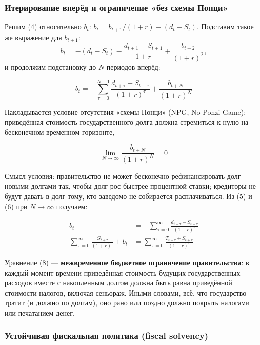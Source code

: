 \documentclass[11pt,a4paper]{article}
\begin{document}
\subsubsection{Итерирование вперёд и ограничение «без схемы Понци»}

Решим (4) относительно $b_t$: $b_t=b_{t+1}/(1+r)-(d_t-S_t)$. Подставим такое же выражение для $b_{t+1}$:
$$b_t=-(d_t-S_t)-\frac{d_{t+1}-S_{t+1}}{1+r}+\frac{b_{t+2}}{(1+r)^2},$$
и продолжим подстановку до $N$ периодов вперёд:
\begin{formulabox}
\begin{equation}
b_t=-\sum_{\tau=0}^{N-1}\frac{d_{t+\tau}-S_{t+\tau}}{(1+r)^{\tau}}+\frac{b_{t+N}}{(1+r)^{N}} \tag{5}
\end{equation}
\end{formulabox}
Накладывается условие отсутствия «схемы Понци» (NPG, No-Ponzi-Game): приведённая стоимость государственного долга должна стремиться к нулю на бесконечном временном горизонте,
\begin{formulabox}
\begin{equation}
\lim_{N\to\infty}\frac{b_{t+N}}{(1+r)^{N}}=0 \tag{6}
\end{equation}
\end{formulabox}
Смысл условия: правительство не может бесконечно рефинансировать долг новыми долгами так, чтобы долг рос быстрее процентной ставки; кредиторы не будут давать в долг тому, кто заведомо не собирается расплачиваться. Из (5) и (6) при $N\to\infty$ получаем:
\begin{formulabox}
\begin{align}
b_t&=-\sum_{\tau=0}^{\infty}\frac{d_{t+\tau}-S_{t+\tau}}{(1+r)^{\tau}} \tag{7}\\
\sum_{\tau=0}^{\infty}\frac{G_{t+\tau}}{(1+r)^{\tau}}+b_t&=\sum_{\tau=0}^{\infty}\frac{T_{t+\tau}+S_{t+\tau}}{(1+r)^{\tau}} \tag{8}
\end{align}
\end{formulabox}
Уравнение (8) --- \textbf{межвременное бюджетное ограничение правительства}: в каждый момент времени приведённая стоимость будущих государственных расходов вместе с накопленным долгом должна быть равна приведённой стоимости налогов, включая сеньораж. Иными словами, всё, что государство тратит (и должно по долгам), оно рано или поздно должно покрыть налогами или печатанием денег.

\subsubsection{Устойчивая фискальная политика (fiscal solvency)}
\end{document}
